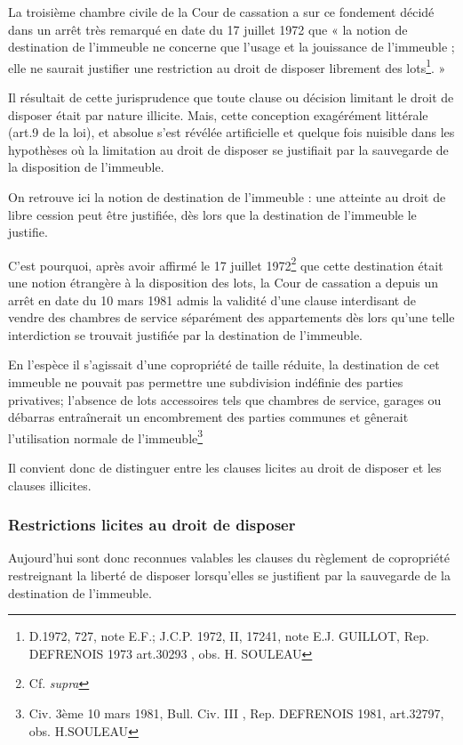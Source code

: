 		La troisième chambre civile de la Cour de cassation a sur ce fondement décidé dans un arrêt très remarqué
		en date du 17 juillet 1972 que « la notion de destination de l'immeuble ne concerne que l'usage et la
		jouissance de l'immeuble ; elle ne saurait justifier une restriction au droit de disposer librement des
		lots\footnote{D.1972, 727, note E.F.; J.C.P. 1972, II, 17241, note E.J. GUILLOT, Rep. DEFRENOIS 1973 art.30293 , obs. H.	SOULEAU}. »
		
		Il résultait de cette jurisprudence que toute clause ou décision limitant le droit de disposer était par nature
		illicite. Mais, cette conception exagérément littérale (art.9 de la loi), et absolue s'est révélée artificielle et
		quelque fois nuisible dans les hypothèses où la limitation au droit de disposer se justifiait par la sauvegarde
		de la disposition de l'immeuble.
		
		On retrouve ici la notion de destination de l’immeuble : une atteinte au droit de libre cession peut être
		justifiée, dès lors que la destination de l’immeuble le justifie.
		
		C'est pourquoi, après avoir affirmé le 17 juillet 1972\footnote{Cf. \emph{supra}} que cette destination était une notion étrangère à
		la disposition des lots, la Cour de cassation a depuis un arrêt en date du 10 mars 1981 admis la validité
		d'une clause interdisant de vendre des chambres de service séparément des appartements dès lors qu'une
		telle interdiction se trouvait justifiée par la destination de l'immeuble.
		
		En l’espèce il s'agissait d'une copropriété de taille réduite, la destination de cet immeuble ne pouvait pas
		permettre une subdivision indéfinie des parties privatives; l'absence de lots accessoires tels que chambres
		de service, garages ou débarras entraînerait un encombrement des parties communes et gênerait
		l'utilisation normale de l'immeuble\footnote{Civ. 3ème 10 mars 1981, Bull. Civ. III , Rep. DEFRENOIS 1981, art.32797, obs. H.SOULEAU}
		
		Il convient donc de distinguer entre les clauses licites au droit de disposer et les clauses illicites.
		
		\subsubsection{Restrictions licites au droit de disposer}
		
			Aujourd'hui sont donc reconnues valables les clauses du règlement de copropriété restreignant la liberté
			de disposer lorsqu'elles se justifient par la sauvegarde de la destination de l'immeuble.
			
